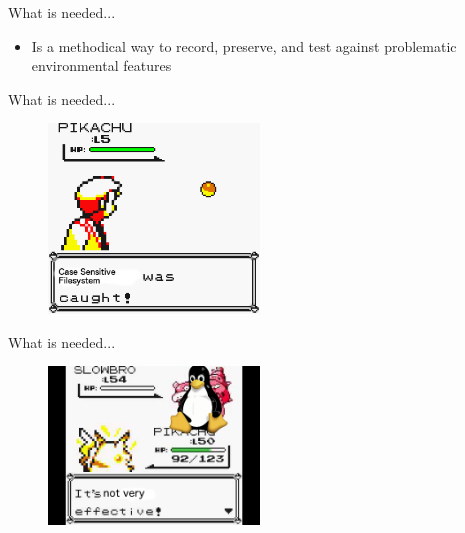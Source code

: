 \documentclass[pdf]{beamer}
\begin{document}
\begin{frame}{What is needed...}
  \begin{itemize}
    \item{Is a methodical way to record, preserve, and test against
      problematic environmental features}
  \end{itemize}
\end{frame}




\begin{frame}{What is needed...}
  \begin{figure}
    \centering
    \includegraphics[width = 0.5\textwidth]{images/wascaught}
  \end{figure}
\end{frame}



\begin{frame}{What is needed...}
  \begin{figure}
    \centering
    \includegraphics[width = 0.5\textwidth]{images/notveryeffective}
  \end{figure}
\end{frame}
\end{document}
